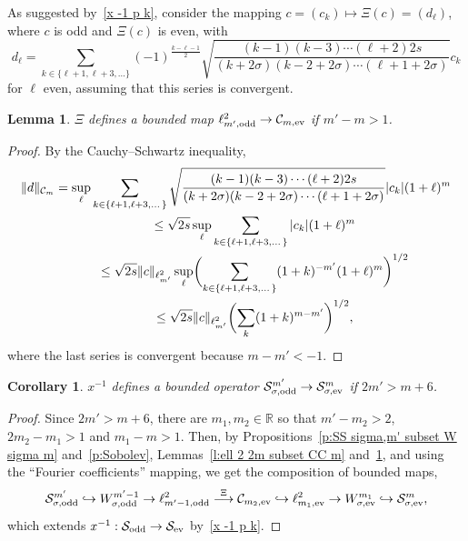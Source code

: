 \documentclass[pdftex]{sigma}
\newtheorem{Corollary}[Theorem]{Corollary}
\newtheorem{Lemma}[Theorem]{Lemma}
\newcommand{\R}{\mathbb{R}}
\newcommand{\CC}{\mathcal{C}}
\renewcommand{\SS}{\mathcal{S}}
\begin{document}
As suggested by~\eqref{x -1 p k}, consider the mapping $c=(c_k)\mapsto\Xi(c)=(d_\ell)$, where $c$ is odd and $\Xi(c)$ is even, with
  \[
    d_\ell=\sum_{k\in\{\ell+1,\ell+3,\dots\}}(-1)^{\frac{k-\ell-1}{2}}\sqrt{\frac{(k-1)(k-3)\cdots(\ell+2)2s}{(k+2\sigma)(k-2+2\sigma)\cdots(\ell+1+2\sigma)}}
    c_k
  \]
for $\ell$ even, assuming that this series is convergent.

\begin{Lemma}\label{l:Xi}
  $\Xi$ defines a bounded map $\ell^2_{m',\text{\rm odd}}\to\CC_{m,\text{\rm ev}}$ if $m'-m>1$.
\end{Lemma}

\begin{proof}
  By the Cauchy--Schwartz  inequality,
    \begin{gather*}
      \|d\|_{\CC_m} =\sup_\ell\sum_{k\in\{\ell+1,\ell+3,\dots\}}\sqrt{\frac{(k-1)(k-3)\cdots(\ell+2)2s}{(k+2\sigma)(k-2+2\sigma)\cdots(\ell+1+2\sigma)}} |c_k| (1+\ell)^m\\
\hphantom{\|d\|_{\CC_m}}{}
\le\sqrt{2s}\sup_\ell\sum_{k\in\{\ell+1,\ell+3,\dots\}}|c_k| (1+\ell)^m\\
\hphantom{\|d\|_{\CC_m}}{}
\le\sqrt{2s} \|c\|_{\ell^2_{m'}}\sup_\ell\biggl(\sum_{k\in\{\ell+1,\ell+3,\dots\}}(1+k)^{-m'}(1+\ell)^m\biggr)^{1/2}\\
\hphantom{\|d\|_{\CC_m}}{}
\le\sqrt{2s} \|c\|_{\ell^2_{m'}}\biggl(\sum_k(1+k)^{m-m'}\biggr)^{1/2} ,
    \end{gather*}
  where the last series is convergent because $m-m'<-1$.
\end{proof}

 \begin{Corollary}\label{c:x^-1:SS_sigma,odd^m_1 to SS_sigma,ev^m bounded}
  $x^{-1}$ defines a bounded operator $\SS_{\sigma,\text{\rm odd}}^{m'}\to\SS_{\sigma,\text{\rm ev}}^m$ if $2m'>m+6$.
\end{Corollary}

\begin{proof}
  Since $2m'>m+6$, there are $m_1,m_2\in\R$ so that $m'-m_2>2$, $2m_2-m_1>1$ and $m_1-m>1$. Then, by Propositions~\ref{p:SS sigma,m' subset W sigma m} and~\ref{p:Sobolev}, Lemmas~\ref{l:ell 2 2m subset CC m} and~\ref{l:Xi}, and using the ``Fourier coef\/f\/icients'' mapping, we get the composition of bounded maps,
    \[
      \SS_{\sigma,\text{\rm odd}}^{m'}\hookrightarrow W_{\sigma,\text{\rm odd}}^{m'-1}\rightarrow\ell^2_{m'-1,\text{\rm odd}}\overset{\Xi}{\longrightarrow}\CC_{m_2,\text{\rm ev}}\hookrightarrow\ell^2_{m_1,\text{\rm ev}}\rightarrow W_{\sigma,\text{\rm ev}}^{m_1}\hookrightarrow\SS_{\sigma,\text{\rm ev}}^m ,
    \]
  which extends $x^{-1}:\SS_{\text{\rm odd}}\to\SS_{\text{\rm ev}}$ by~\eqref{x -1 p k}.
\end{proof}
\end{document}
